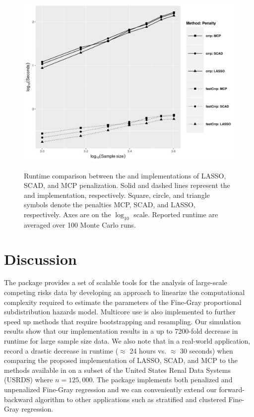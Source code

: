 \begin{figure}[t!]
\centering
\includegraphics[scale = 0.6]{plots/log_PEN-eps-converted-to.pdf}
\label{fig3:pen}
\caption{Runtime comparison between the  and  implementations of LASSO, SCAD, and MCP penalization. Solid and dashed lines represent the  and  implementation, respectively. Square, circle, and triangle symbols denote the penalties MCP, SCAD, and LASSO, respectively. Axes are on the $\log_{10}$ scale. Reported runtime are averaged over 100 Monte Carlo runs.}
\end{figure}

\section{Discussion}
The  package provides a set of scalable tools for the analysis of large-scale competing risks data by developing an approach to linearize the computational complexity required to estimate the parameters of the Fine-Gray proportional subdistribution hazards model. Multicore use is also implemented to further speed up methods that require bootstrapping and resampling. Our simulation results show that our implementation results in a up to 7200-fold decrease in runtime for large sample size data. We also note that in a real-world application, \cite{kawaguchi2019scalable} record a drastic decrease in runtime ($\approx$ 24 hours vs. $\approx$ 30 seconds) when comparing the proposed implementation of LASSO, SCAD, and MCP to the methods available in  on a subset of the United States Renal Data Systems (USRDS) where $n =125, 000$.
The package implements both penalized and unpenalized Fine-Gray regression and we can conveniently extend our forward-backward algorithm to other applications such as stratified and clustered Fine-Gray regression. 

